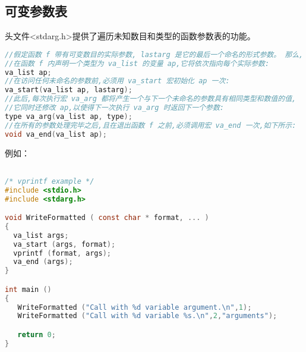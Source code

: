 \subsection{可变参数表}
头文件<stdarg.h>提供了遍历未知数目和类型的函数参数表的功能。


\begin{lstlisting}[language=C]
//假定函数 f 带有可变数目的实际参数, lastarg 是它的最后一个命名的形式参数。 那么,
//在函数 f 内声明一个类型为 va_list 的变量 ap,它将依次指向每个实际参数:
va_list ap;
//在访问任何未命名的参数前,必须用 va_start 宏初始化 ap 一次:
va_start(va_list ap, lastarg);
//此后,每次执行宏 va_arg 都将产生一个与下一个未命名的参数具有相同类型和数值的值,
//它同时还修改 ap,以使得下一次执行 va_arg 时返回下一个参数:
type va_arg(va_list ap, type);
//在所有的参数处理完毕之后,且在退出函数 f 之前,必须调用宏 va_end 一次,如下所示:
void va_end(va_list ap);
\end{lstlisting}

例如：
\begin{lstlisting}[language=C]

/* vprintf example */
#include <stdio.h>
#include <stdarg.h>

void WriteFormatted ( const char * format, ... )
{
  va_list args;
  va_start (args, format);
  vprintf (format, args);
  va_end (args);
}

int main ()
{
   WriteFormatted ("Call with %d variable argument.\n",1);
   WriteFormatted ("Call with %d variable %s.\n",2,"arguments");

   return 0;
}
\end{lstlisting}
























